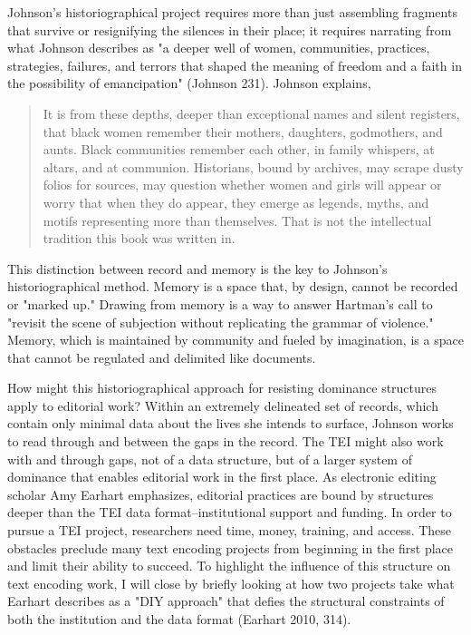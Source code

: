 \documentclass[11pt]{article}
\begin{document}
Johnson's historiographical project requires more than just assembling
fragments that survive or resignifying the silences in their place; it
requires narrating from what Johnson describes as "a deeper well of
women, communities, practices, strategies, failures, and terrors that
shaped the meaning of freedom and a faith in the possibility of
emancipation" (Johnson 231). Johnson explains,
\begin{quote}
It is from these depths, deeper than exceptional names and silent
registers, that black women remember their mothers, daughters,
godmothers, and aunts. Black communities remember each other, in
family whispers, at altars, and at communion. Historians, bound by
archives, may scrape dusty folios for sources, may question whether
women and girls will appear or worry that when they do appear, they
emerge as legends, myths, and motifs representing more than
themselves. That is not the intellectual tradition this book was
written in. 
\end{quote}
This distinction between record and memory is the key to Johnson's
historiographical method. Memory is a space that, by design, cannot be
recorded or "marked up." Drawing from memory is a way to answer
Hartman's call to "revisit the scene of subjection without replicating
the grammar of violence." Memory, which is maintained by community and
fueled by imagination, is a space that cannot be regulated and
delimited like documents.

How might this historiographical approach for resisting dominance
structures apply to editorial work? Within an extremely delineated set
of records, which contain only minimal data about the lives she
intends to surface, Johnson works to read through and between the gaps
in the record. The TEI might also work with and through gaps, not of a
data structure, but of a larger system of dominance that enables
editorial work in the first place. As electronic editing scholar Amy
Earhart emphasizes, editorial practices are bound by structures deeper
than the TEI data format--institutional support and funding. In order
to pursue a TEI project, researchers need time, money, training, and
access. These obstacles preclude many text encoding projects from
beginning in the first place and limit their ability to succeed. To
highlight the influence of this structure on text encoding work, I
will close by briefly looking at how two projects take what Earhart
describes as a "DIY approach" that defies the structural constraints
of both the institution and the data format (Earhart 2010, 314).
\end{document}
